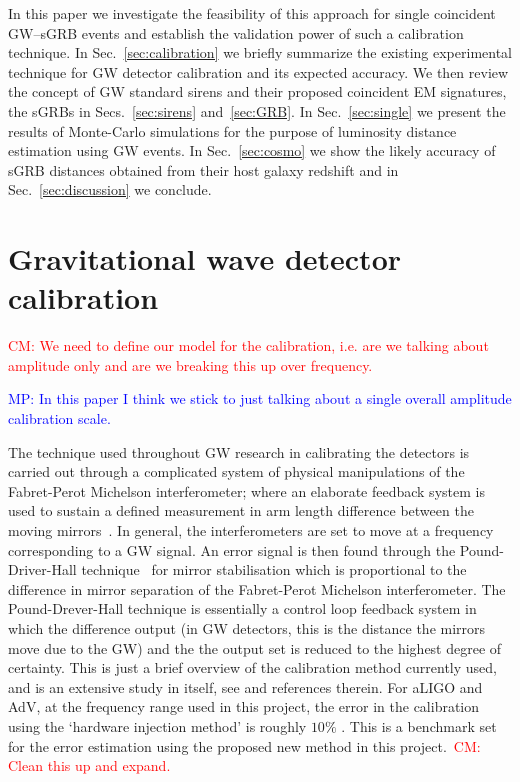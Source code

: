 \documentclass[10pt]{iopart}
\newcommand{\cm}[1]{\textcolor{red}{CM: #1}}
\newcommand{\MP}[1]{\textcolor{blue}{MP: #1}}
\begin{document}
In this paper we investigate the feasibility of this approach for single
coincident \ac{GW}--\ac{sGRB} events and establish the validation power of such
a calibration technique.  In Sec.~\ref{sec:calibration} we briefly summarize
the existing experimental technique for \ac{GW} detector calibration and its
expected accuracy.  We then review the concept of \ac{GW} standard sirens and
their proposed coincident \ac{EM} signatures, the \acp{sGRB} in
Secs.~\ref{sec:sirens} and~\ref{sec:GRB}. In Sec.~\ref{sec:single} we present
the results of Monte-Carlo simulations for the purpose of luminosity distance
estimation using \ac{GW} events. In Sec.~\ref{sec:cosmo} we show the likely
accuracy of \ac{sGRB} distances obtained from their host galaxy redshift and in
Sec.~\ref{sec:discussion} we conclude.    

\section{Gravitational wave detector calibration\label{sec:calibration}}

\cm{We need to define our model for the calibration, i.e. are we talking
about amplitude only and are we breaking this up over frequency.}

\MP{In this paper I think we stick to just talking about a single overall amplitude calibration scale.}

The technique used throughout GW research in calibrating the detectors is
carried out through a complicated system of physical manipulations of the
Fabret-Perot Michelson interferometer; where an elaborate feedback system is
used to sustain a defined measurement in arm length difference between the
moving mirrors~\cite{LIGOCal}. In general, the interferometers are set to move
at a frequency corresponding to a GW signal. An error signal is then found
through the Pound-Driver-Hall technique~\cite{Black} for mirror stabilisation
which is proportional to the difference in mirror separation of the
Fabret-Perot Michelson interferometer. The Pound-Drever-Hall technique is
essentially a control loop feedback system in which the difference output (in
GW detectors, this is the distance the mirrors move due to the GW) and the the
output set is reduced to the highest degree of certainty. This is just a brief
overview of the calibration method currently used, and is an extensive study in
itself, see \cite{Vitale:2012} and references therein. For \ac{aLIGO} and \ac{AdV},
at the frequency range used in this project, the error in the calibration using
the `hardware injection method' is roughly $10\%$ \cite{Vitale:2012}. This is a
benchmark set for the error estimation using the proposed new method in this
project.~\cm{Clean this up and expand.}
\end{document}
